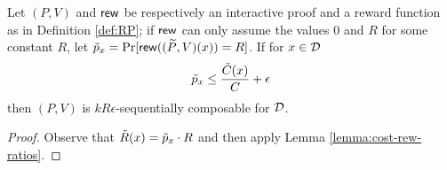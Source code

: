 \begin{corollary}
\label{cor:prob}
Let $(P,V)$ and $\mathsf{rew}$ be respectively an interactive proof and a reward 
function as in 
Definition \ref{def:RP}; if $\mathsf{rew}$ can only assume the values $0$ and $R$ for 
some constant $R$, let $\tilde{p}_x = \Pr[\mathsf{rew}((\widetilde{P},V)(x)) = R]$. If for $x \in {\cal D}$
$$  \tilde{p}_x \leq \frac{\tilde{C}(x)}{C} + \epsilon $$
then $(P,V)$ is $kR\epsilon$-sequentially composable for $\cal D$. 
\end{corollary}
\begin{proof}
Observe that $\tilde{R}(x) = \tilde{p}_x\cdot R$ and then apply Lemma 
\ref{lemma:cost-rew-ratios}.
\end{proof}


